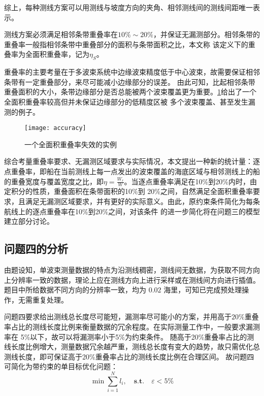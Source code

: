 \documentclass[withoutpreface,bwprint]{cumcmthesis} %
\begin{document}
        综上，每种测线方案可以用测线与坡度方向的夹角、相邻测线间的测线间距唯一表示。

        测线方案必须满足相邻条带重叠率在$10\%\sim 20\%$，并保证无漏测部分。相邻条带的重叠率一般指相邻条带中重叠部分的面积与条带面积之比，本文称
        该定义下的重叠率为全面积重叠率，记为$\eta_S$。
        
        重叠率的主要考量在于多波束系统中边缘波束精度低于中心波束，故需要保证相邻条带有一定重叠部分，来尽可能减小边缘部分的误差\cite{bib_3}。
        由此可知，比起相邻条带重叠面积的大小，条带边缘部分是否总能被两个波束覆盖更为重要。\cref{fig:accuracy}给出了一个全面积重叠率较高但并未保证边缘部分的低精度区被
        多个波束覆盖、甚至发生漏测的例子。
        \begin{figure}[H]
            \centering
            \texttt{[image: accuracy]}
            \caption{一个全面积重叠率失效的实例}
            \label{fig:accuracy}
        \end{figure}
        综合考量重叠率要求、无漏测区域要求与实际情况，本文提出一种新的统计量：逐点重叠率，即船在当前测线上每一点发出的波束覆盖的海底区域与相邻测线上的船
        的重叠宽度与覆盖宽度之比，即$\eta = \frac{W_r}{W}$。当逐点重叠率满足在10\%到20\%内时，由定积分的性质，重叠面积在条带面积的10\%到
        20\%之间，自然满足全面积重叠率要求，且满足无漏测区域要求，并有更好的实际意义。由此，原约束条件简化为每条航线上的逐点重叠率在10\%到20\%之间，对该条件
        的进一步简化将在问题三的模型建立部分讨论。

        \subsection{问题四的分析}
        由题设知，单波束测量数据的特点为沿测线稠密，测线间无数据，为获取不同方向上分辨率一致的数据，理论上应在测线方向上进行采样或在测线间方向进行插值。
        题目中所给数据不同方向的分辨率一致，均为 $0.02$ 海里，可知已完成预处理操作，无需重复处理。

        问题四要求给出测线总长度尽可能短，漏测率尽可能小的方案，并用高于$20\%$重叠率占比的测线长度比例来衡量数据的冗余程度。在实际测量工作中，一般要求漏测率在
        5\%以下，故可以将漏测率小于5\%为约束条件\cite{bib_3}。
        随高于20\%重叠率占比的测线长度比例增大，测量数据冗余越严重，测线总长度有变大的趋势，故只需优化总测线长度，即可保证高于20\%重叠率占比的测线长度比例在合理区间。
        故问题四可简化为带约束的单目标优化问题：$$\min \sum\limits_{i=1}^N l_i, \quad\mathbf{s.t.}\quad \varepsilon < 5 \%$$
        
\end{document}
